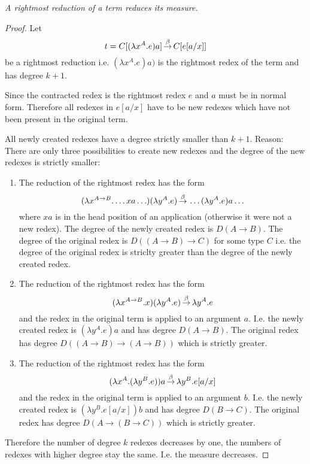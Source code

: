 \begin{theorem}
    \emph{A rightmost reduction of a term reduces its measure.}

    \begin{proof}
        Let
        $$
        t = C[(\lambda x^A.e) a] {\,\stackrel{\beta}{\to}\,} C[e[a/x]]
        $$
        be a rightmost reduction i.e. $(\lambda x^A.e)a)$ is the rightmost redex
        of the term and has degree $k+1$.

        Since the contracted redex is the rightmost redex $e$ and $a$ must be
        in normal form. Therefore all redexes in $e[a/x]$ have to be new redexes
        which have not been present in the original term.

        All newly created redexes have a degree strictly smaller than $k+1$.
        Reason: There are only three possibilities to create new redexes and the
        degree of the new redexes is strictly smaller:
        \begin{enumerate}
            \item The reduction of the rightmost redex has the form
                $$
                (\lambda x^{A \to B}. \ldots x a \ldots ) (\lambda y^A.e)
                {\,\stackrel{\beta}{\to}\,}
                \ldots (\lambda y^A. e) a \ldots
                $$
                where $x a$ is in the head position of an application (otherwise
                it were not a new redex). The degree of the newly created redex
                is $D(A \to B)$. The degree of the original redex is $D((A \to
                B) \to C)$ for some type $C$ i.e. the degree of the original
                redex is striclty greater than the degree of the newly created
                redex.

            \item The reduction of the rightmost redex has the form
                $$
                (\lambda x^{A \to B}. x) (\lambda y^A. e)
                {\,\stackrel{\beta}{\to}\,}
                \lambda y^A. e
                $$
                and the redex in the original term is applied to an argument
                $a$. I.e. the newly created redex is $(\lambda y^A. e) a$ and
                has degree $D(A \to B)$. The original redex has degree $D((A \to
                B) \to (A \to B))$ which is strictly greater.


            \item The reduction of the rightmost redex has the form
                $$
                (\lambda x^A. (\lambda y^B. e)) a
                {\,\stackrel{\beta}{\to}\,}
                \lambda y^B. e[a/x]
                $$
                and the redex in the original term is applied to an argument
                $b$. I.e. the newly created redex is $(\lambda y^B. e[a/x]) b$
                and has degree $D(B \to C)$. The original redex has degree $D(A
                 \to (B \to C))$ which is strictly greater.
        \end{enumerate}

        Therefore the number of degree $k$ redexes decreases by one, the numbers
        of redexes with higher degree stay the same. I.e. the measure decreases.
    \end{proof}
\end{theorem}

